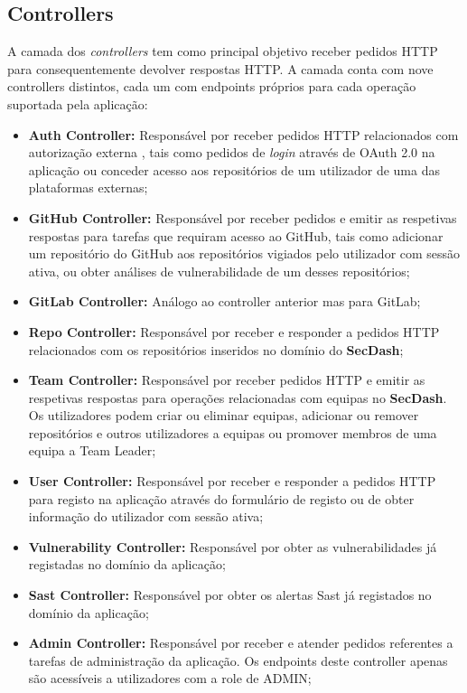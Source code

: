 \subsection{Controllers}
A camada dos \textit{controllers} tem como principal objetivo receber pedidos HTTP para consequentemente devolver respostas HTTP. A camada conta com nove controllers distintos, cada um com endpoints próprios para cada operação suportada pela aplicação: 
\begin{itemize}
	\item \textbf{Auth Controller:} Responsável por receber pedidos HTTP relacionados com autorização externa , tais como pedidos de \textit{login} através de OAuth 2.0 na aplicação ou conceder acesso aos repositórios de um utilizador de uma das plataformas externas;
	
	\item \textbf{GitHub Controller:} Responsável por receber pedidos e emitir as respetivas respostas para tarefas que requiram acesso ao GitHub, tais como adicionar um repositório do GitHub aos repositórios vigiados pelo utilizador com sessão ativa, ou obter análises de vulnerabilidade de um desses repositórios;
	
	\item \textbf{GitLab Controller:} Análogo ao controller anterior mas para GitLab;
	
	\item \textbf{Repo Controller:} Responsável por receber e responder a pedidos HTTP relacionados com os repositórios inseridos no domínio do \textbf{SecDash};
	
	\item \textbf{Team Controller:} Responsável por receber pedidos HTTP e emitir as respetivas respostas para operações relacionadas com equipas no \textbf{SecDash}. Os utilizadores podem criar ou eliminar equipas, adicionar ou remover repositórios e outros utilizadores a equipas ou promover membros de uma equipa a Team Leader;
	
	\item \textbf{User Controller:} Responsável por receber e responder a pedidos HTTP para registo na aplicação através do formulário de registo ou de obter informação do utilizador com sessão ativa;
	
	\item \textbf{Vulnerability Controller:} Responsável por obter as vulnerabilidades já registadas no domínio da aplicação;
	
	\item \textbf{Sast Controller:} Responsável por obter os alertas Sast já registados no domínio da aplicação;
	
	\item \textbf{Admin Controller:} Responsável por receber e atender pedidos referentes a tarefas de administração da aplicação. Os endpoints deste controller apenas são acessíveis a utilizadores com a role de ADMIN;
	
\end{itemize}

